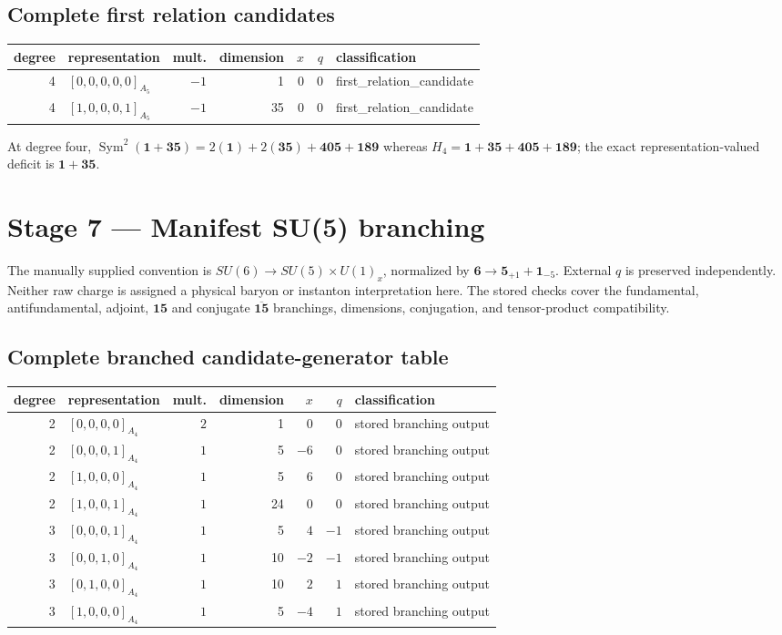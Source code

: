 \documentclass[11pt]{article}
\newcommand{\Dynkin}[1]{#1}
\begin{document}
\subsection{Complete first relation candidates}
\begin{longtable}{r l r r r r l}
\toprule degree & representation & mult. & dimension & $x$ & $q$ & classification\\\midrule\endhead
4 & $\Dynkin{[0,0,0,0,0]_{A_5}}$ & $-1$ & 1 & $0$ & $0$ & first\_relation\_candidate\\
4 & $\Dynkin{[1,0,0,0,1]_{A_5}}$ & $-1$ & 35 & $0$ & $0$ & first\_relation\_candidate\\
\bottomrule\end{longtable}
At degree four, $\operatorname{Sym}^2(\mathbf1+\mathbf{35})=2(\mathbf1)+2(\mathbf{35})+\mathbf{405}+\mathbf{189}$ whereas $H_4=\mathbf1+\mathbf{35}+\mathbf{405}+\mathbf{189}$; the exact representation-valued deficit is $\mathbf1+\mathbf{35}$.
\section{Stage 7 --- Manifest SU(5) branching}
The manually supplied convention is $SU(6)\to SU(5)\times U(1)_x$, normalized by $\mathbf6\to\mathbf5_{+1}+\mathbf1_{-5}$. External $q$ is preserved independently. Neither raw charge is assigned a physical baryon or instanton interpretation here.
The stored checks cover the fundamental, antifundamental, adjoint, $\mathbf{15}$ and conjugate $\overline{\mathbf{15}}$ branchings, dimensions, conjugation, and tensor-product compatibility.
\subsection{Complete branched candidate-generator table}
\begin{longtable}{r l r r r r l}
\toprule degree & representation & mult. & dimension & $x$ & $q$ & classification\\\midrule\endhead
2 & $\Dynkin{[0,0,0,0]_{A_4}}$ & $2$ & 1 & $0$ & $0$ & stored branching output\\
2 & $\Dynkin{[0,0,0,1]_{A_4}}$ & $1$ & 5 & $-6$ & $0$ & stored branching output\\
2 & $\Dynkin{[1,0,0,0]_{A_4}}$ & $1$ & 5 & $6$ & $0$ & stored branching output\\
2 & $\Dynkin{[1,0,0,1]_{A_4}}$ & $1$ & 24 & $0$ & $0$ & stored branching output\\
3 & $\Dynkin{[0,0,0,1]_{A_4}}$ & $1$ & 5 & $4$ & $-1$ & stored branching output\\
3 & $\Dynkin{[0,0,1,0]_{A_4}}$ & $1$ & 10 & $-2$ & $-1$ & stored branching output\\
3 & $\Dynkin{[0,1,0,0]_{A_4}}$ & $1$ & 10 & $2$ & $1$ & stored branching output\\
3 & $\Dynkin{[1,0,0,0]_{A_4}}$ & $1$ & 5 & $-4$ & $1$ & stored branching output\\
\bottomrule\end{longtable}
\end{document}
